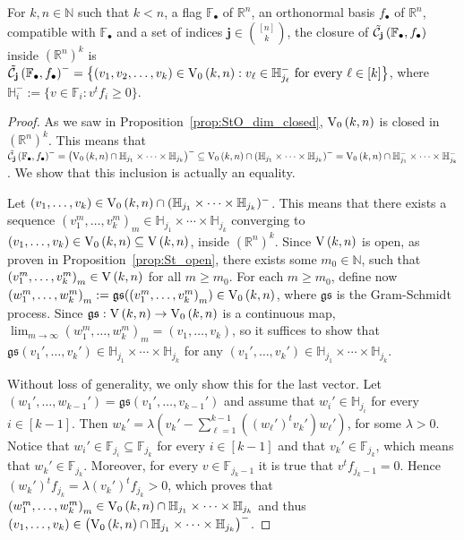 \begin{lemma}\label{lem:closure_of_cells} For $k,n\in\mathbb{N}$ such that $k<n$, a flag $\mathbb{F}_{\bullet}$ of $\mathbb{R}^n$, an orthonormal basis $f_{\bullet}$ of $\mathbb{R}^n$, compatible with $\mathbb{F}_{\bullet}$ and a set of indices $\mathbf{j}\in\binom{[n]}{k}$, the closure of $\tilde{\mathcal{C}}_{\mathbf{j}}\left(\mathbb{F}_{\bullet},f_{\bullet}\right)$ inside ${\left(\mathbb{R}^n\right)}^k$ is $\stcell{j}^-=\left\{(v_1,v_2,\ldots,v_k)\in\StO{k}{n}:v_{\ell}\in\mathbb{H}_{j_{\ell}}^-\text{ for every }\ell\in[k]\right\}$, where $\mathbb{H}_i^-:=\{v\in\mathbb{F}_i:v^tf_i\geq 0\}$.
\end{lemma}
\begin{proof} As we saw in Proposition~\ref{prop:StO_dim_closed}, $\StO{k}{n}$ is closed in ${\left(\mathbb{R}^n\right)}^k$. This means that $\stcell{j}^-={\big(\StO{k}{n}\cap\mathbb{H}_{j_1}\times\cdots\times\mathbb{H}_{j_k}\big)}^-\subseteq\StO{k}{n}\cap{(\mathbb{H}_{j_1}\times\cdots\times\mathbb{H}_{j_k})}^-=\StO{k}{n}\cap\mathbb{H}_{j_1}^-\times\cdots\times\mathbb{H}_{j_k}^-$. We show that this inclusion is actually an equality.

Let $(v_1,\ldots,v_k)\in\StO{k}{n}\cap(\mathbb{H}_{j_1}\times\cdots\times\mathbb{H}_{j_k})^-$. This means that there exists a sequence ${(v_1^m,\ldots,v_k^m)}_m\in\mathbb{H}_{j_1}\times\cdots\times\mathbb{H}_{j_k}$ converging to $(v_1,\ldots,v_k)\in\StO{k}{n}\subseteq\St{k}{n}$, inside ${\left(\mathbb{R}^n\right)}^k$. Since $\St{k}{n}$ is open, as proven in Proposition~\ref{prop:St_open}, there exists some $m_0\in\mathbb{N}$, such that ${(v_1^m,\ldots,v_k^m)}_m\in\St{k}{n}$ for all $m\geq m_0$. For each $m\geq m_0$, define now ${(w_1^m,\ldots,w_k^m)}_m:=\mathfrak{gs}({(v_1^m,\ldots,v_k^m)}_m)\in\StO{k}{n}$, where $\mathfrak{gs}$ is the Gram-Schmidt process. Since $\mathfrak{gs}:\St{k}{n}\to\StO{k}{n}$ is a continuous map, $\lim_{m\to\infty}(w_1^m,\ldots,w_k^m)_m=(v_1,\ldots,v_k)$, so it suffices to show that $\mathfrak{gs}(v_1',\ldots,v_k')\in\mathbb{H}_{j_1}\times\cdots\times\mathbb{H}_{j_k}$ for any $(v_1',\ldots,v_k')\in\mathbb{H}_{j_1}\times\cdots\times\mathbb{H}_{j_k}$.

Without loss of generality, we only show this for the last vector. Let $(w_1',\ldots,w_{k-1}')=\mathfrak{gs}(v_1',\ldots,v_{k-1}')$ and assume that $w_i'\in\mathbb{H}_{j_i}$ for every $i\in[k-1]$. Then $w_k'=\lambda\left(v_k'-\sum_{\ell=1}^{k-1}((w_{\ell}')^tv_k')w_{\ell}'\right)$, for some $\lambda>0$. Notice that $w_i'\in\mathbb{F}_{j_i}\subseteq\mathbb{F}_{j_k}$ for every $i\in[k-1]$ and that $v_k'\in\mathbb{F}_{j_k}$, which means that $w_k'\in\mathbb{F}_{j_k}$. Moreover, for every $v\in\mathbb{F}_{j_k-1}$ it is true that $v^tf_{j_k-1}=0$. Hence $(w_k')^tf_{j_k}=\lambda(v_k')^tf_{j_k}>0$, which proves that ${(w_1^m,\ldots,w_k^m)}_m\in\StO{k}{n}\cap\mathbb{H}_{j_1}\times\cdots\times\mathbb{H}_{j_k}$ and thus
$(v_1,\ldots,v_k)\in{\big(\StO{k}{n}\cap\mathbb{H}_{j_1}\times\cdots\times\mathbb{H}_{j_k}\big)}^-$.
\end{proof}

